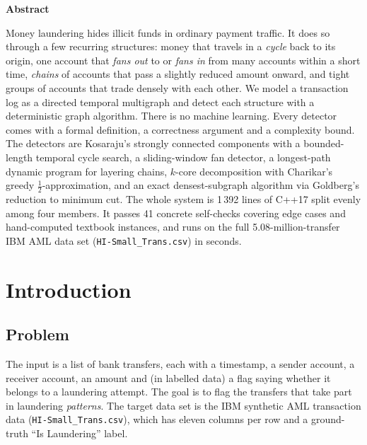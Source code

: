 \documentclass[11pt,a4paper]{article}
\theoremstyle{definition}
\begin{document}
\setcounter{page}{1}

\begin{center}
\textbf{Abstract}
\end{center}
\noindent
Money laundering hides illicit funds in ordinary payment traffic. It does so through a few recurring structures: money that travels in a \emph{cycle} back to its origin, one account that \emph{fans out} to or \emph{fans in} from many accounts within a short time, \emph{chains} of accounts that pass a slightly reduced amount onward, and tight groups of accounts that trade densely with each other. We model a transaction log as a directed temporal multigraph and detect each structure with a deterministic graph algorithm. There is no machine learning. Every detector comes with a formal definition, a correctness argument and a complexity bound. The detectors are Kosaraju's strongly connected components with a bounded-length temporal cycle search, a sliding-window fan detector, a longest-path dynamic program for layering chains, $k$-core decomposition with Charikar's greedy $\frac{1}{2}$-approximation, and an exact densest-subgraph algorithm via Goldberg's reduction to minimum cut. The whole system is 1\,392 lines of C++17 split evenly among four members. It passes 41 concrete self-checks covering edge cases and hand-computed textbook instances, and runs on the full 5.08-million-transfer IBM AML data set (\texttt{HI-Small\_Trans.csv}) in seconds.

\tableofcontents
\newpage

\section{Introduction}

\subsection{Problem}
The input is a list of bank transfers, each with a timestamp, a sender account, a receiver account, an amount and (in labelled data) a flag saying whether it belongs to a laundering attempt. The goal is to flag the transfers that take part in laundering \emph{patterns}. The target data set is the IBM synthetic AML transaction data (\texttt{HI-Small\_Trans.csv}), which has eleven columns per row and a ground-truth ``Is Laundering'' label.
\end{document}
